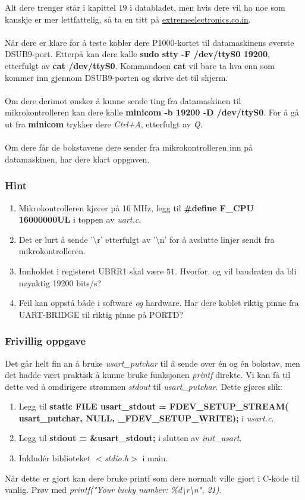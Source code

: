 \documentclass[11pt,a4paper]{article}
\begin{document}
Alt dere trenger står i kapittel 19 i databladet, men hvis dere vil ha noe som kanskje er mer lettfattelig, så ta en titt på \href{http://extremeelectronics.co.in/avr-tutorials/using-the-usart-of-avr-microcontrollers/}{extremeelectronics.co.in}.\\
\\
Når dere er klare for å teste kobler dere P1000-kortet til datamaskinens øverste DSUB9-port. Etterpå kan dere kalle \textbf{sudo stty -F /dev/ttyS0 19200}, etterfulgt av \textbf{cat /dev/ttyS0}. Kommandoen \textbf{cat} vil bare ta hva enn som kommer inn gjennom DSUB9-porten og skrive det til skjerm.\\
\\
Om dere derimot ønsker å kunne sende ting fra datamaskinen til mikrokontrolleren kan dere kalle \textbf{minicom -b 19200 -D /dev/ttyS0}. For å gå ut fra \textbf{minicom} trykker dere \textit{Ctrl+A}, etterfulgt av \textit{Q}.\\
\\
Om dere får de bokstavene dere sender fra mikrokontrolleren inn på datamaskinen, har dere klart oppgaven.
\subsubsection{Hint}
\begin{enumerate}
\item Mikrokontrolleren kjører på 16 MHz, legg til \textbf{\#define F\_CPU 16000000UL} i toppen av \textit{uart.c}.
\item Det er lurt å sende '\textbackslash r' etterfulgt av '\textbackslash n' for å avslutte linjer sendt fra mikrokontrolleren.
\item Innholdet i registeret UBRR1 skal være $51$. Hvorfor, og vil baudraten da bli nøyaktig 19200 bits/s?
\item Feil kan oppstå både i software \textit{og} hardware. Har dere koblet riktig pinne fra UART-BRIDGE til riktig pinne på PORTD?
\end{enumerate}
\subsubsection{Frivillig oppgave}
Det går helt fin an å bruke \textit{usart\_putchar} til å sende over én og én bokstav, men det hadde vært praktisk å kunne bruke funksjonen \textit{printf} direkte. Vi kan få til dette ved å omdirigere strømmen \textit{stdout} til \textit{usart\_putchar}. Dette gjøres slik:
\begin{enumerate}
\item Legg til \textbf{static FILE usart\_stdout = FDEV\_SETUP\_STREAM( usart\_putchar, NULL, \_FDEV\_SETUP\_WRITE);} i \textit{usart.c}.
\item Legg til \textbf{stdout = \&usart\_stdout;} i slutten av \textit{init\_usart}.
\item Inkludér biblioteket $<$\textit{stdio.h}$>$ i main.
\end{enumerate}
Når dette er gjort kan dere bruke printf som dere normalt ville gjort i C-kode til vanlig. Prøv med \textit{printf("Your lucky number: \%d\textbackslash r\textbackslash n", 21)}.
\end{document}
